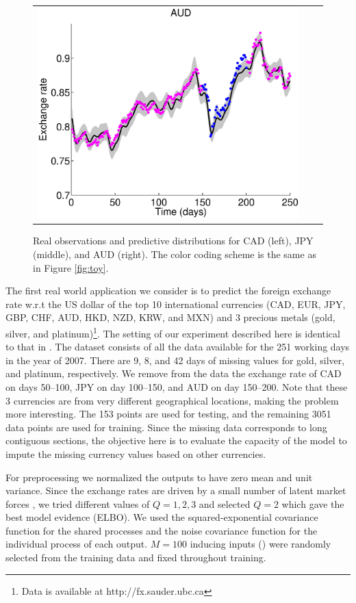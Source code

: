 \begin{figure}
\begin{tabular}{ccc}
\includegraphics[scale=0.28]{figures/fxAUD.eps}
\end{tabular}
\caption{Real observations and predictive distributions for CAD (left), JPY (middle), and AUD (right). The color coding scheme is the same as in Figure \ref{fig:toy}.}
\label{fig:fx}
\end{figure}

The first real world application we consider is to predict the foreign exchange rate w.r.t the US dollar of the top 10 international currencies (CAD, EUR, JPY, GBP, CHF, AUD, HKD, NZD, KRW, and MXN) and 3 precious metals (gold, silver, and platinum)\footnote{Data is available at http://fx.sauder.ubc.ca}. 
The setting of our experiment described here is identical to that in \citet{alvarez2010efficient}.
The dataset consists of all the data available for the 251 working days in the year of 2007.
There are 9, 8, and 42 days of missing values  for gold, silver, and platinum, respectively.
We remove from the data the exchange rate of CAD on days 50--100, JPY on day 100--150, and AUD on day 150--200.
Note that these 3 currencies are from very different geographical locations, making the problem more interesting. 
The 153 points are used for testing, and the remaining 3051 data points are used for training.
Since the missing data corresponds to long contiguous sections, the objective here is to evaluate the capacity of the model to impute the missing currency values based on other currencies.

For preprocessing we normalized the outputs to have zero mean and unit variance.
Since the exchange rates are driven by a small number of latent market forces \citep[see e.g.][]{alvarez2010efficient}, we tried different values of $Q = {1,2,3}$ and selected $Q = 2$ which gave the best model evidence (ELBO).
We used the squared-exponential covariance function for the shared processes and the noise covariance function for the individual process of each output.
$M = 100$ inducing inputs () were randomly selected from the training data and fixed throughout training.

